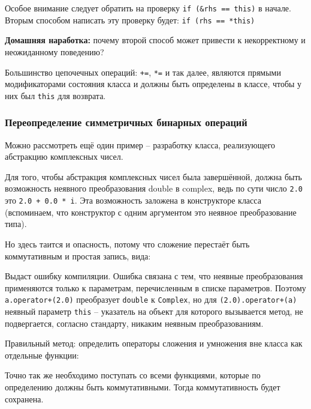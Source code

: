 \documentclass[a4paper,12pt,oneside]{article}
\begin{document}
Особое внимание следует обратить на проверку \lstinline!if (&rhs == this)! в начале. Вторым способом написать эту проверку будет: \lstinline!if (rhs == *this)!

\textbf{Домашняя наработка:} почему второй способ может привести к некорректному и неожиданному поведению?

Большинство цепочечных операций: \lstinline!+=!, \lstinline!*=! и так далее, являются прямыми модификаторами состояния класса и должны быть определены в классе, чтобы у них был \lstinline!this! для возврата.

\subsubsection{Переопределение симметричных бинарных операций}\label{SymmBinary}

Можно рассмотреть ещё один пример -- разработку класса, реализующего абстракцию комплексных чисел.

Для того, чтобы абстракция комплексных чисел была завершённой, должна быть возможность неявного преобразования double в complex, ведь по сути число \lstinline!2.0! это \lstinline!2.0 + 0.0 * i!. Эта возможность заложена в конструкторе класса (вспоминаем, что конструктор с одним аргументом это неявное преобразование типа).



Но здесь таится и опасность, потому что сложение перестаёт быть коммутативным и простая запись, вида:



Выдаст ошибку компиляции. Ошибка связана с тем, что неявные преобразования применяются только к параметрам, перечисленным в списке параметров. Поэтому \lstinline!a.operator+(2.0)! преобразует \lstinline!double! к \lstinline!Complex!, но для \lstinline!(2.0).operator+(a)! неявный параметр \lstinline!this! -- указатель на объект для которого вызывается метод, не подвергается, согласно стандарту, никаким неявным преобразованиям.

Правильный метод: определить операторы сложения и умножения вне класса как отдельные функции:



Точно так же необходимо поступать со всеми функциями, которые по определению должны быть коммутативными. Тогда коммутативность будет сохранена.
\end{document}
